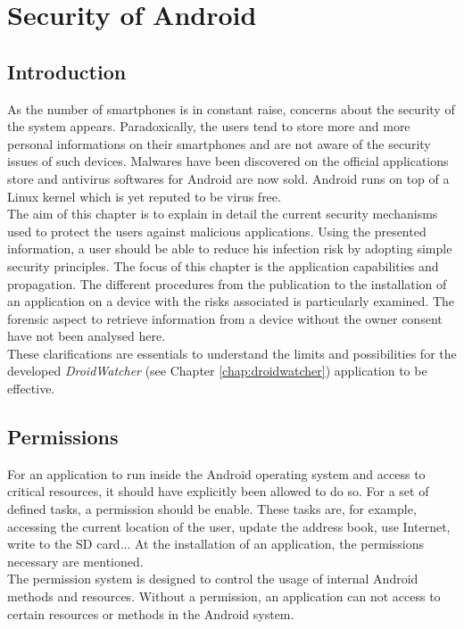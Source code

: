 \chapter{Security of Android}
\label{chap:and-secu}

\section*{Introduction}
As the number of smartphones is in constant raise, concerns about the security of the system appears.
Paradoxically, the users tend to store more and more personal informations on their smartphones and are not aware of the security issues of such devices.
Malwares have been discovered on the official applications store and antivirus softwares for Android are now sold.
Android runs on top of a Linux kernel which is yet reputed to be virus free.\\

The aim of this chapter is to explain in detail the current security mechanisms used to protect the users against malicious applications.
Using the presented information, a user should be able to reduce his infection risk by adopting simple security principles.
The focus of this chapter is the application capabilities and propagation.
The different procedures from the publication to the installation of an application on a device with the risks associated is particularly examined.
The forensic aspect to retrieve information from a device without the owner consent have not been analysed here.\\

These clarifications are essentials to understand the limits and possibilities for the developed \emph{DroidWatcher} (see Chapter \ref{chap:droidwatcher}) application to be effective.

\section{Permissions}
For an application to run inside the Android operating system and access to critical resources, it should have explicitly been allowed to do so.
For a set of defined tasks, a permission should be enable.
These tasks are, for example, accessing the current location of the user, update the address book, use Internet, write to the SD card...
At the installation of an application, the permissions necessary are mentioned.\\

The permission system is designed to control the usage of internal Android methods and resources.
Without a permission, an application can not access to certain resources or methods in the Android system.

